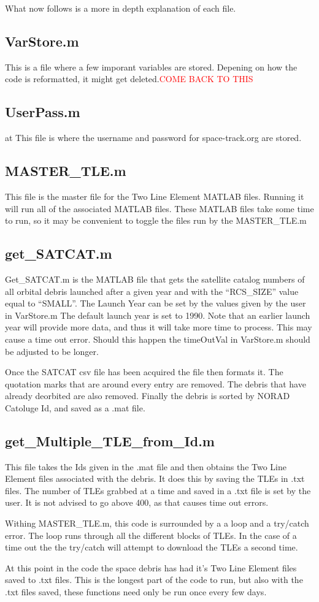 \documentclass[12pt]{report}
\begin{document}
	What now follows is a more in depth explanation of each file. 
		\subsection{VarStore.m}
		This is a file where a few imporant variables are stored. Depening on how the code is reformatted, it might get deleted.\textcolor{red}{COME BACK TO THIS}
		\subsection{UserPass.m}at
		This file is where the username and password for space-track.org are stored. 
		\subsection{MASTER\_TLE.m}
		This file is the master file for the Two Line Element MATLAB files. Running it will run all of the associated MATLAB files. These MATLAB files take some time to run, so it may be convenient to toggle the files run by the MASTER\_TLE.m
		\subsection{get\_SATCAT.m}
		Get\_SATCAT.m is the MATLAB file that gets the satellite catalog  numbers of all orbital debris launched after a given year and with the “RCS\_SIZE” value equal to “SMALL”. The Launch Year can be set by the values given by the user in VarStore.m The default launch year is set to 1990. Note that an earlier launch year will provide more data, and thus it will take more time to process. This may cause a time out error. Should this happen the timeOutVal in VarStore.m should be adjusted to be longer.\par 
		Once the SATCAT csv file has been acquired the file then formats it. The quotation marks that are around every entry are removed. The debris that have already deorbited are also removed. Finally the debris is sorted by NORAD Catoluge Id, and saved as a .mat file.
		\subsection{get\_Multiple\_TLE\_from\_Id.m}
		This file takes the Ids given in the .mat file and then obtains the Two Line Element files associated with the debris. It does this by saving the TLEs in .txt files. The number of TLEs grabbed at a time and saved in a .txt file is set by the user. It is not advised to go above 400, as that causes time out errors. \par 
		Withing MASTER\_TLE.m, this code is surrounded by a a loop and a try/catch error. The loop runs through all the different blocks of TLEs. In the case of a time out the the try/catch will attempt to download the TLEs a second time.\par 
		At this point in the code the space debris has had it's Two Line Element files saved to .txt files. This is the longest part of the code to run, but also with the .txt files saved, these functions need only be run once every few days. 
\end{document}
